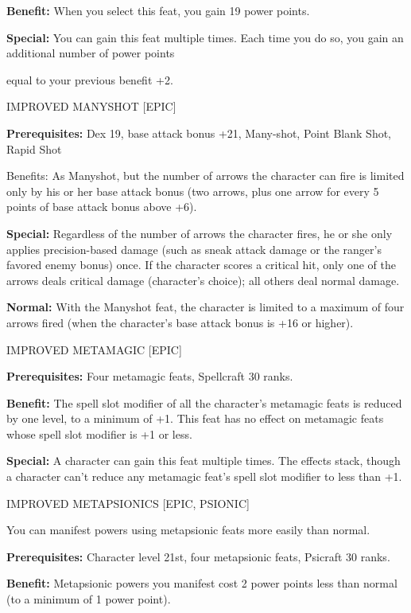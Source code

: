 \documentclass{article}
\begin{document}
\textbf{Benefit:} When you select this feat, you gain 19 power points.

\textbf{Special:} You can gain this feat multiple times. Each time you do so, you 
gain an additional number of power points

equal to your previous benefit +2.

\vspace{12pt}
IMPROVED MANYSHOT [EPIC] 

\textbf{Prerequisites:} Dex 19, base attack bonus +21, Many-shot, Point Blank Shot, 
Rapid Shot 

Benefits: As Manyshot, but the number of arrows the character can fire is limited 
only by his or her base attack bonus (two arrows, plus one arrow for every 5 points 
of base attack bonus above +6). 

\textbf{Special:} Regardless of the number of arrows the character fires, he or 
she only applies precision-based damage (such as sneak attack damage or the ranger's 
favored enemy bonus) once. If the character scores a critical hit, only one of 
the arrows deals critical damage (character's choice); all others deal normal damage. 

\textbf{Normal:} With the Manyshot feat, the character is limited to a maximum 
of four arrows fired (when the character's base attack bonus is +16 or higher).

\vspace{12pt}
IMPROVED METAMAGIC [EPIC] 

\textbf{Prerequisites:} Four metamagic feats, Spellcraft 30 ranks. 

\textbf{Benefit:} The spell slot modifier of all the character's metamagic feats 
is reduced by one level, to a minimum of +1. This feat has no effect on metamagic 
feats whose spell slot modifier is +1 or less. 

\textbf{Special:} A character can gain this feat multiple times. The effects stack, 
though a character can't reduce any metamagic feat's spell slot modifier to less 
than +1. 

\vspace{12pt}
IMPROVED METAPSIONICS [EPIC, PSIONIC]

You can manifest powers using metapsionic feats more easily than normal.

\textbf{Prerequisites:} Character level 21st, four metapsionic feats, Psicraft 
30 ranks.

\textbf{Benefit: }Metapsionic powers you manifest cost 2 power points less than 
normal (to a minimum of 1 power point).
\end{document}
